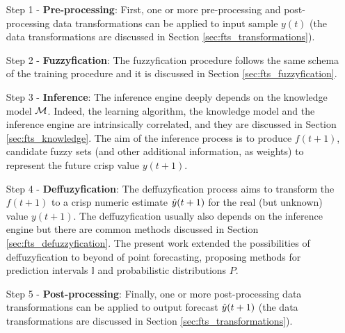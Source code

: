 \begin{enumerate}
    \item [Step 1] - \textbf{Pre-processing}: First, one or more pre-processing and post-processing data transformations can be applied to input sample $y(t)$ (the data transformations are discussed in Section \ref{sec:fts_transformations}).
    
    \item[Step 2] - \textbf{Fuzzyfication}: The fuzzyfication procedure follows the same schema of the training procedure and it is discussed in Section \ref{sec:fts_fuzzyfication}. 
    
    \item[Step 3] - \textbf{Inference}: The inference engine deeply depends on the knowledge model $\mathcal{M}$. Indeed, the learning algorithm, the knowledge model and the inference engine are intrinsically correlated, and they are discussed in Section \ref{sec:fts_knowledge}. The aim of the inference process is to produce $f(t+1)$, candidate fuzzy sets (and other additional information, as weights) to represent the future crisp value $y(t+1)$.
    
    \item[Step 4] - \textbf{Deffuzyfication}: The deffuzyfication process aims to transform the $f(t+1)$ to a crisp numeric estimate $\hat{y}(t+1)$ for the real (but unknown) value $y(t+1)$. The deffuzyfication usually also depends on the inference engine but there are common methods discussed in Section \ref{sec:fts_defuzzyfication}. The present work extended the possibilities of deffuzyfication to beyond of point forecasting, proposing methods for prediction intervals $\mathbb{I}$ and probabilistic distributions $P$.
    
    \item [Step 5] - \textbf{Post-processing}: Finally, one or more post-processing data transformations can be applied to output forecast $\hat{y}(t+1)$  (the data transformations are discussed in Section \ref{sec:fts_transformations}).
\end{enumerate}

